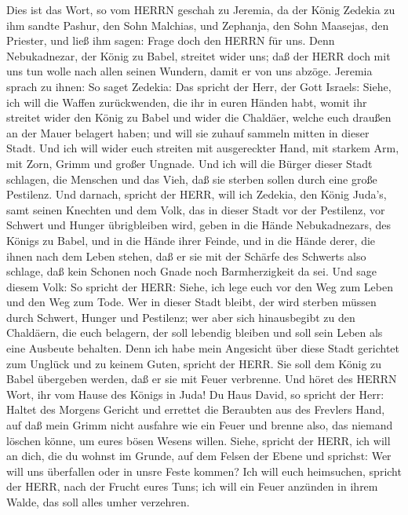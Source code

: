  Dies ist das Wort, so vom HERRN geschah zu Jeremia, da der
König Zedekia zu ihm sandte Pashur, den Sohn Malchias, und Zephanja, den
Sohn Maasejas, den Priester, und ließ ihm sagen:  Frage doch
den HERRN für uns. Denn Nebukadnezar, der König zu Babel, streitet wider
uns; daß der HERR doch mit uns tun wolle nach allen seinen Wundern,
damit er von uns abzöge.  Jeremia sprach zu ihnen: So saget
Zedekia:  Das spricht der Herr, der Gott Israels: Siehe, ich
will die Waffen zurückwenden, die ihr in euren Händen habt, womit ihr
streitet wider den König zu Babel und wider die Chaldäer, welche euch
draußen an der Mauer belagert haben; und will sie zuhauf sammeln mitten
in dieser Stadt.  Und ich will wider euch streiten mit
ausgereckter Hand, mit starkem Arm, mit Zorn, Grimm und großer Ungnade.
 Und ich will die Bürger dieser Stadt schlagen, die Menschen
und das Vieh, daß sie sterben sollen durch eine große Pestilenz.
 Und darnach, spricht der HERR, will ich Zedekia, den König
Juda's, samt seinen Knechten und dem Volk, das in dieser Stadt vor der
Pestilenz, vor Schwert und Hunger übrigbleiben wird, geben in die Hände
Nebukadnezars, des Königs zu Babel, und in die Hände ihrer Feinde, und
in die Hände derer, die ihnen nach dem Leben stehen, daß er sie mit der
Schärfe des Schwerts also schlage, daß kein Schonen noch Gnade noch
Barmherzigkeit da sei.  Und sage diesem Volk: So spricht der
HERR: Siehe, ich lege euch vor den Weg zum Leben und den Weg zum Tode.
 Wer in dieser Stadt bleibt, der wird sterben müssen durch
Schwert, Hunger und Pestilenz; wer aber sich hinausbegibt zu den
Chaldäern, die euch belagern, der soll lebendig bleiben und soll sein
Leben als eine Ausbeute behalten.  Denn ich habe mein
Angesicht über diese Stadt gerichtet zum Unglück und zu keinem Guten,
spricht der HERR. Sie soll dem König zu Babel übergeben werden, daß er
sie mit Feuer verbrenne.  Und höret des HERRN Wort, ihr vom
Hause des Königs in Juda!  Du Haus David, so spricht der
Herr: Haltet des Morgens Gericht und errettet die Beraubten aus des
Frevlers Hand, auf daß mein Grimm nicht ausfahre wie ein Feuer und
brenne also, das niemand löschen könne, um eures bösen Wesens willen.
 Siehe, spricht der HERR, ich will an dich, die du wohnst
im Grunde, auf dem Felsen der Ebene und sprichst: Wer will uns
überfallen oder in unsre Feste kommen?  Ich will euch
heimsuchen, spricht der HERR, nach der Frucht eures Tuns; ich will ein
Feuer anzünden in ihrem Walde, das soll alles umher verzehren.

